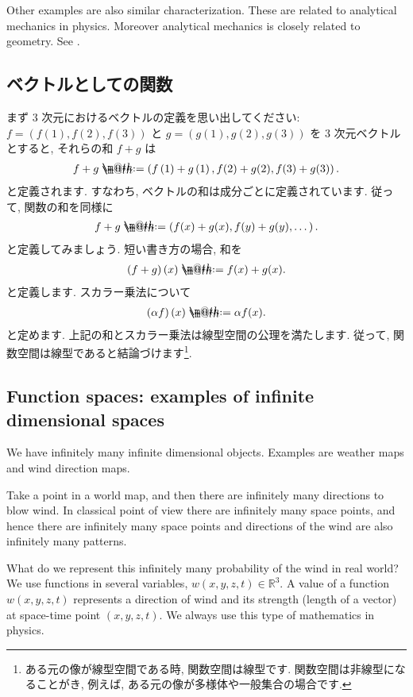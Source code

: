 \documentclass[openany, a4paper, oneside]{jsbook}
\makeatletter
\newcommand*{\defeq}{\mathrel{\rlap{%
\raisebox{0.3ex}{$\m@th\cdot$}}%
\raisebox{-0.3ex}{$\m@th\cdot$}}%
=}
\theoremstyle{break}
\theoremstyle{breakdefn}
\newcommand{\rbk}[1]{\left (#1\right)}
\newcommand{\bbR}{\mathbb{R}}
\makeatother
\begin{document}
Other examples are also similar characterization.
These are related to analytical mechanics in physics.
Moreover analytical mechanics is closely related to geometry.
See \cite{KenjiFukaya1, NakamuraYamamoto1, NakamuraYamamoto2}.
\subsection{ベクトルとしての関数}


まず 3 次元におけるベクトルの定義を思い出してください:
$f = (f(1), f(2), f(3))$ と $g = (g(1), g(2), g(3))$ を 3 次元ベクトルとすると,
それらの和 $f + g$ は
\begin{align}
 f + g
 \defeq
 \rbk{f\rbk{1} + g \rbk{1}, f(2) + g(2), f(3) + g(3)}.
\end{align}
と定義されます.
すなわち, ベクトルの和は成分ごとに定義されています.
従って, 関数の和を同様に
\begin{align}
 f + g
 \defeq
 \rbk{f(x) + g(x), f(y) + g(y), \dots}.
\end{align}
と定義してみましょう.
短い書き方の場合, 和を
\begin{align}
 \rbk{f + g} (x)
 \defeq
 f(x) + g(x).
\end{align}
と定義します.
スカラー乗法について
\begin{align}
 \rbk{\alpha f} (x)
 \defeq
 \alpha f (x).
\end{align}
と定めます.
上記の和とスカラー乗法は線型空間の公理を満たします.
従って, 関数空間は線型であると結論づけます\footnote{ある元の像が線型空間である時, 関数空間は線型です.
関数空間は非線型になることがき, 例えば, ある元の像が多様体や一般集合の場合です.}.
\subsection{Function spaces: examples of infinite dimensional spaces}


We have infinitely many infinite dimensional objects.
Examples are weather maps and wind direction maps.

Take a point in a world map,
and then there are infinitely many directions to blow wind.
In classical point of view there are infinitely many space points,
and hence there are infinitely many space points and
directions of the wind are also infinitely many patterns.

What do we represent this infinitely many probability of the wind in real world?
We use functions in several variables, $w(x,y,z,t) \in \bbR^3$.
A value of a function $w(x,y,z,t)$ represents a direction of wind and its strength (length of a vector)
at space-time point $\rbk{x, y, z, t}$.
We always use this type of mathematics in physics.
\end{document}
